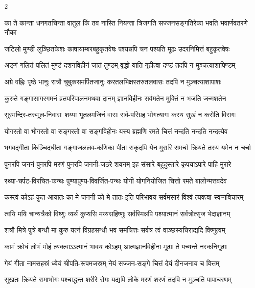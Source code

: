 \begin{large}
\begin{multicols}{2}
\begin{flushleft}
\fourlineindentedshloka
{का ते कान्ता धनगतचिन्ता}
{वातुल किं तव नास्ति नियन्ता}
{त्रिजगति सज्जनसङ्गतिरेका}
{भवति भवार्णवतरणे नौका}

\fourlineindentedshloka
{जटिलो मुण्डी लुञ्छितकेशः}
{काषायाम्बरबहुकृतवेषः}
{पश्यन्नपि चन पश्यति मूढः}
{उदरनिमित्तं बहुकृतवेषः}

\fourlineindentedshloka
{अङ्गं गलितं पलितं मुण्डं}
{दशनविहीनं जातं तुण्डम्}
{वृद्धो याति गृहीत्वा दण्डं}
{तदपि न मुञ्चत्याशापिण्डम्}

\fourlineindentedshloka
{अग्रे वह्निः पृष्ठे भानुः}
{रात्रौ चुबुकसमर्पितजानुः}
{करतलभिक्षस्तरुतलवासः}
{तदपि न मुञ्चत्याशापाशः}

\fourlineindentedshloka
{कुरुते गङ्गासागरगमनं}
{व्रतपरिपालनमथवा दानम्}
{ज्ञानविहीनः सर्वमतेन}
{मुक्तिं न भजति जन्मशतेन}

\fourlineindentedshloka
{सुरमन्दिर-तरुमूल-निवासः}
{शय्या भूतलमजिनं वासः}
{सर्व-परिग्रह भोगत्यागः}
{कस्य सुखं न करोति विरागः}

\fourlineindentedshloka
{योगरतो वा भोगरतो वा}
{सङ्गरतो वा सङ्गविहीनः}
{यस्य ब्रह्मणि रमते चित्तं}
{नन्दति नन्दति नन्दत्येव}

\fourlineindentedshloka
{भगवद्गीता किञ्चिदधीता}
{गङ्गाजललव-कणिका पीता}
{सकृदपि येन मुरारि समर्चा}
{क्रियते तस्य यमेन न चर्चा}

\fourlineindentedshloka
{पुनरपि जननं पुनरपि मरणं}
{पुनरपि जननी-जठरे शयनम्}
{इह संसारे बहुदुस्तारे}
{कृपयाऽपारे पाहि मुरारे}

\fourlineindentedshloka
{रथ्या-चर्पट-विरचित-कन्थः}
{पुण्यापुण्य-विवर्जित-पन्थः}
{योगी योगनियोजित चित्तो}
{रमते बालोन्मत्तवदेव}

\fourlineindentedshloka
{कस्त्वं कोऽहं कुत आयातः}
{का मे जननी को मे तातः}
{इति परिभावय सर्वमसारं}
{विश्वं त्यक्त्वा स्वप्नविचारम्}

\fourlineindentedshloka
{त्वयि मयि चान्यत्रैको विष्णुः}
{व्यर्थं कुप्यसि मय्यसहिष्णुः}
{सर्वस्मिन्नपि पश्यात्मानं}
{सर्वत्रोत्सृज भेदाज्ञानम्}

\fourlineindentedshloka
{शत्रौ मित्रे पुत्रे बन्धौ}
{मा कुरु यत्नं विग्रहसन्धौ}
{भव समचित्तः सर्वत्र त्वं}
{वाञ्छस्यचिराद्यदि विष्णुत्वम्}

\fourlineindentedshloka
{कामं क्रोधं लोभं मोहं}
{त्यक्त्वाऽऽत्मानं भावय कोऽहम्}
{आत्मज्ञानविहीना मूढाः}
{ते पच्यन्ते नरकनिगूढाः}

\fourlineindentedshloka
{गेयं गीता नामसहस्रं}
{ध्येयं श्रीपति-रूपमजस्रम्}
{नेयं सज्जन-सङ्गे चित्तं}
{देयं दीनजनाय च वित्तम्}

\fourlineindentedshloka
{सुखतः क्रियते रामाभोगः}
{पश्चाद्धन्त शरीरे रोगः}
{यद्यपि लोके मरणं शरणं}
{तदपि न मुञ्चति पापाचरणम्}


\end{flushleft}
\end{multicols}
\end{large}
